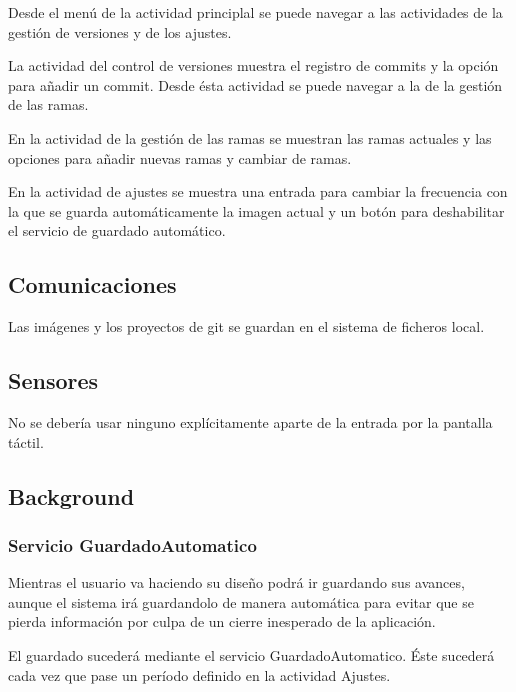 \documentclass[a4paper,openright,12pt]{article}
\begin{document}
Desde el menú de la actividad principlal se puede navegar a las actividades de la gestión de versiones y de los ajustes.

La actividad del control de versiones muestra el registro de commits y la opción para añadir un commit. Desde ésta actividad se puede navegar a la de la gestión de las ramas.

En la actividad de la gestión de las ramas se muestran las ramas actuales y las opciones para añadir nuevas ramas y cambiar de ramas.

En la actividad de ajustes se muestra una entrada para cambiar la frecuencia con la que se guarda automáticamente la imagen actual y un botón para deshabilitar el servicio de guardado automático.


\subsection{Comunicaciones}
Las imágenes y los proyectos de git se guardan en el sistema de ficheros local.

\subsection{Sensores}
No se debería usar ninguno explícitamente aparte de la entrada por la pantalla táctil.

\subsection{Background}
\subsubsection{Servicio GuardadoAutomatico}
Mientras el usuario va haciendo su diseño podrá ir guardando sus 
avances, aunque el sistema irá guardandolo de manera automática para
evitar que se pierda información por culpa de un cierre inesperado
de la aplicación.

El guardado sucederá mediante el servicio GuardadoAutomatico. Éste sucederá cada vez que pase un período definido en la actividad Ajustes.




\end{document}
